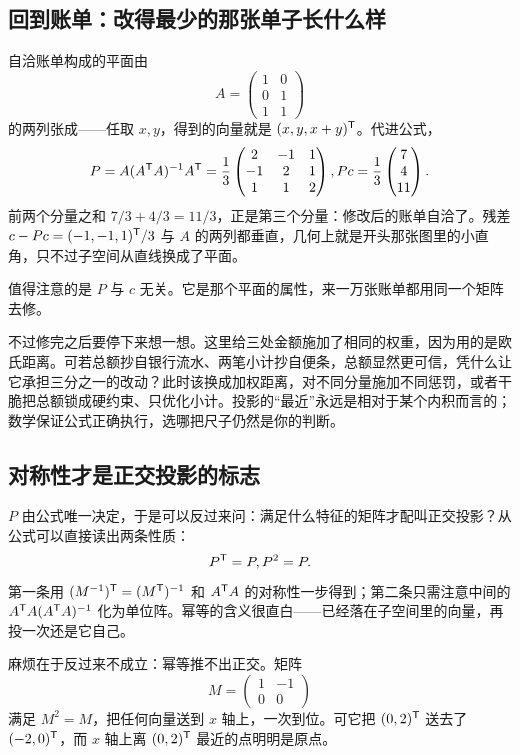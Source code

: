 \subsection{回到账单：改得最少的那张单子长什么样}

自洽账单构成的平面由
\[
A=\begin{pmatrix}1&0\\0&1\\1&1\end{pmatrix}
\]
的两列张成——任取 \(x,y\)，得到的向量就是 \((x,y,x+y)^{\mathsf{T}}\)。代进公式，
\[
P=A(A^{\mathsf{T}}A)^{-1}A^{\mathsf{T}}
=\frac13\begin{pmatrix}2&-1&1\\-1&2&1\\1&1&2\end{pmatrix},
\space
Pc=\frac13\begin{pmatrix}7\\4\\11\end{pmatrix}.
\]
前两个分量之和 \(7/3+4/3=11/3\)，正是第三个分量：修改后的账单自洽了。残差 \(c-Pc=(-1,-1,1)^{\mathsf{T}}/3\) 与 \(A\) 的两列都垂直，几何上就是开头那张图里的小直角，只不过子空间从直线换成了平面。

值得注意的是 \(P\) 与 \(c\) 无关。它是那个平面的属性，来一万张账单都用同一个矩阵去修。

不过修完之后要停下来想一想。这里给三处金额施加了相同的权重，因为用的是欧氏距离。可若总额抄自银行流水、两笔小计抄自便条，总额显然更可信，凭什么让它承担三分之一的改动？此时该换成加权距离，对不同分量施加不同惩罚，或者干脆把总额锁成硬约束、只优化小计。投影的``最近''永远是相对于某个内积而言的；数学保证公式正确执行，选哪把尺子仍然是你的判断。

\subsection{对称性才是正交投影的标志}

\(P\) 由公式唯一决定，于是可以反过来问：满足什么特征的矩阵才配叫正交投影？从公式可以直接读出两条性质：
\[
P^{\mathsf{T}}=P,\space P^2=P .
\]
第一条用 \((M^{-1})^{\mathsf{T}}=(M^{\mathsf{T}})^{-1}\) 和 \(A^{\mathsf{T}}A\) 的对称性一步得到；第二条只需注意中间的 \(A^{\mathsf{T}}A(A^{\mathsf{T}}A)^{-1}\) 化为单位阵。幂等的含义很直白——已经落在子空间里的向量，再投一次还是它自己。

麻烦在于反过来不成立：幂等推不出正交。矩阵
\[
M=\begin{pmatrix}1&-1\\0&0\end{pmatrix}
\]
满足 \(M^2=M\)，把任何向量送到 \(x\) 轴上，一次到位。可它把 \((0,2)^{\mathsf{T}}\) 送去了 \((-2,0)^{\mathsf{T}}\)，而 \(x\) 轴上离 \((0,2)^{\mathsf{T}}\) 最近的点明明是原点。

